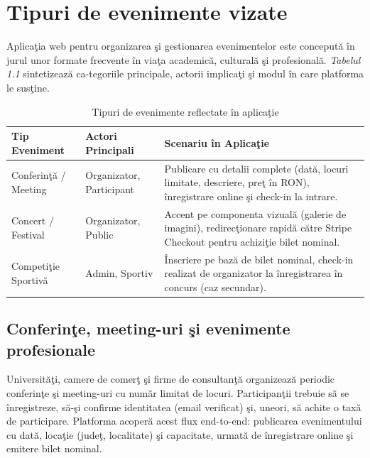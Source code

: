 \section{Tipuri de evenimente vizate}
\sloppy
Aplica\c tia web pentru organizarea \c si gestionarea evenimentelor este conceput\u a \^in jurul unor formate frecvente \^in via\c ta academic\u a, cultural\u a \c si profesional\u a. \textit{Tabelul 1.1} sintetizeaz\u a ca-tegoriile principale, actorii implica\c ti \c si modul \^in care platforma le sus\c tine. 

\begin{table}[htbp]
	\centering
	\renewcommand{\arraystretch}{1.5} 
	\setlength{\tabcolsep}{10pt} %
	\begin{tabular}{|l|l|p{5.5cm}|} 
		\hline
		\textbf{Tip Eveniment} & \textbf{Actori Principali} & \textbf{Scenariu \^in Aplica\c tie} \\ \hline
		Conferin\c t\u a / Meeting & Organizator, Participant & Publicare cu detalii complete (dat\u a, locuri limitate, descriere, pre\c t \^in RON), \^inregistrare online \c si check-in la intrare. \\ \hline
		Concert / Festival & Organizator, Public & Accent pe componenta vizual\u a (galerie de imagini), redirec\c tionare rapid\u a c\u atre Stripe Checkout pentru achizi\c tie bilet nominal. \\ \hline
		Competi\c tie Sportiv\u a & Admin, Sportiv & \^Inscriere pe baz\u a de bilet nominal, check-in realizat de organizator la \^inregistrarea \^in concurs (caz secundar). \\ \hline
	\end{tabular}

	\caption{Tipuri de evenimente reflectate \^in aplica\c tie}
	\label{tab:evenimente}
\end{table}

\subsection{Conferin\c te, meeting-uri \c si evenimente profesionale}

Universit\u a\c ti, camere de comer\c t \c si firme de consultan\c t\u a organizeaz\u a periodic conferin\c te \c si meeting-uri cu num\u ar limitat de locuri. Participan\c tii trebuie s\u a se \^inregistreze, s\u a-\c si confirme identitatea (email verificat) \c si, uneori, s\u a achite o tax\u a de participare. Platforma acoper\u a acest flux end-to-end: publicarea evenimentului cu dat\u a, loca\c tie (jude\c t, localitate) \c si capacitate, urmat\u a de \^inregistrare online \c si emitere bilet nominal.


